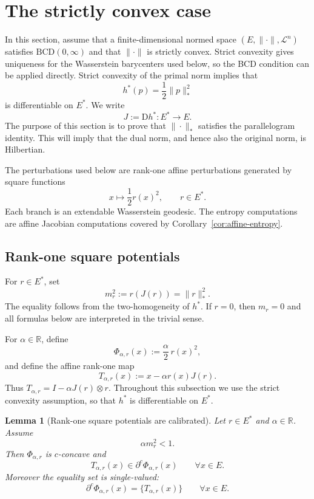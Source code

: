 \documentclass[a4paper,11pt]{article}
\numberwithin{equation}{section}
\newtheorem{lemma}[theorem]{Lemma}
\newcommand{\R}{\mathbb{R}}
\newcommand{\D}{\mathrm D}
\begin{document}
	
	
	
	
	\section{The strictly convex case}\label{sec:strict-case}
	
	In this section, assume that a finite-dimensional normed space \((E,\|\cdot\|,\mathcal L^n)\) satisfies \(\mathrm{BCD}(0,\infty)\) and that $\|\cdot\|$ is strictly convex. Strict convexity gives uniqueness for the Wasserstein barycenters used below, so the BCD condition can be applied directly.
	Strict convexity of the primal norm implies that
	\[
	h^*(p)=\frac12\|p\|_*^2
	\]
	is differentiable on \(E^*\). We write
	\[
	J:=\D h^*:E^*\to E.
	\]
	The purpose of this section is to prove that \(\|\cdot\|_*\) satisfies the parallelogram
	identity. This will imply that the dual norm, and hence also the original norm, is
	Hilbertian.
	
	The perturbations used below are rank-one affine perturbations generated by square functions
	\[
	x\longmapsto \frac12 r(x)^2,
	\qquad r\in E^*.
	\]
	Each branch is an extendable Wasserstein geodesic. The entropy computations are affine Jacobian computations covered by Corollary~\ref{cor:affine-entropy}.
	
	\subsection{Rank-one square potentials}\label{subsec:rank-one-square-potentials}
	
	For \(r\in E^*\), set
	\[
	m_r^2:=r(J(r))=\|r\|_*^2.
	\]
	The equality follows from the two-homogeneity of \(h^*\). If \(r=0\), then
	\(m_r=0\) and all formulas below are interpreted in the trivial sense.
	
	For \(\alpha\in\R\), define
	\[
	\Phi_{\alpha,r}(x):=\frac{\alpha}{2}\,r(x)^2,
	\]
	and define the affine rank-one map
	\[
	T_{\alpha,r}(x):=x-\alpha r(x)J(r).
	\]
	Thus \(T_{\alpha,r}=I-\alpha J(r)\otimes r\).
	Throughout this subsection we use the strict convexity assumption, so that
	\(h^*\) is differentiable on \(E^*\). 
	
	\begin{lemma}[Rank-one square potentials are calibrated]
		\label{lem:rank-one-square-calibration}
		Let \(r\in E^*\) and \(\alpha\in\R\). Assume
		\begin{equation}\label{eq:rank-one-admissibility}
			\alpha m_r^2<1.
		\end{equation}
		Then \(\Phi_{\alpha,r}\) is \(c\)-concave and
		\[
		T_{\alpha,r}(x)\in\partial^c\Phi_{\alpha,r}(x)
		\qquad\forall x\in E.
		\]
		Moreover the equality set is single-valued:
		\[
		\partial^c\Phi_{\alpha,r}(x)=\{T_{\alpha,r}(x)\}
		\qquad\forall x\in E.
		\]
	\end{lemma}
	
\end{document}

